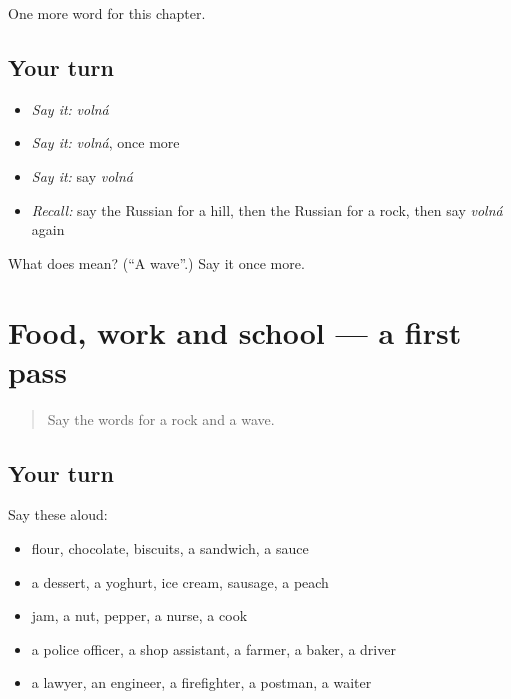 \begin{grammarlens}[title={What you've built}]
One more word for this chapter.
\end{grammarlens}

\subsection*{Your turn}
\begin{itemize}
\raggedright
  \item \emph{Say it:} \emph{volná}
  \item \emph{Say it:} \emph{volná}, once more
  \item \emph{Say it:} say \emph{volná}
  \item \emph{Recall:} say the Russian for a hill, then the Russian for a rock, then say \emph{volná} again
\end{itemize}

\begin{tcolorbox}[breakable,colback=teal!4,colframe=teal!35!black,title={Before you move on}]
What does  mean? (\textquotedblleft{}A wave\textquotedblright{}.) Say it once more.
\end{tcolorbox}
\section[(dialogue)]{Food, work and school — a first pass}

\label{lesson:RU-R115-first-pass-food-work-and-school}



\begin{quote}
Say the words for a rock and a wave.
\end{quote}

\subsection*{Your turn}
Say these aloud:

\begin{itemize}
\raggedright
  \item flour, chocolate, biscuits, a sandwich, a sauce
  \item a dessert, a yoghurt, ice cream, sausage, a peach
  \item jam, a nut, pepper, a nurse, a cook
  \item a police officer, a shop assistant, a farmer, a baker, a driver
  \item a lawyer, an engineer, a firefighter, a postman, a waiter
\end{itemize}

